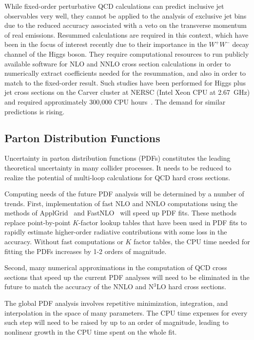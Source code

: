 \documentclass[12pt]{article}
\newcommand{\registered}{\textsuperscript{\textregistered}\xspace}
\begin{document}
While fixed-order perturbative QCD calculations can predict inclusive
jet observables very well, they cannot be applied to the analysis of 
exclusive jet bins due to the reduced accuracy associated with
a veto on the transverse momentum of real emissions.
Resummed calculations are required in this context, which have been
in the focus of interest recently due to their importance in the
$W^+W^-$ decay channel of the Higgs boson. They require computational
resources to run publicly available software for NLO and NNLO cross
section calculations in order to numerically extract coefficients needed
for the resummation, and also in order to match to the fixed-order result. 
Such studies have been performed for Higgs plus jet cross sections
on the Carver cluster at NERSC (Intel\registered Xeon\registered CPU at 2.67~GHz) 
and required approximately 300,000 CPU hours~\cite{Stewart:2013faa}. 
The demand for similar predictions is rising.

\subsection{Parton Distribution Functions}

Uncertainty in parton distribution functions (PDFs) constitutes the
leading theoretical uncertainty in many collider processes. It needs
to be reduced to realize the potential of multi-loop calculations for
QCD hard cross sections.

Computing needs of the future PDF analysis will be determined by a
number of trends.  First, implementation of fast NLO and NNLO
computations using the methods of ApplGrid~\cite{Carli:2010rw} 
and FastNLO~\cite{Kluge:2006xs} will speed up
PDF fits. These methods replace point-by-point $K$-factor lookup tables that
have been used in PDF fits to rapidly estimate higher-order radiative
contributions with some loss in the accuracy.  Without fast
computations or $K$ factor tables, the CPU time needed for fitting the PDFs
increases by 1-2 orders of magnitude.

Second, many numerical approximations in the computation of QCD cross
sections that speed up the current PDF analyses will need to be
eliminated in the future to match the accuracy of the NNLO and N$^3$LO
hard cross sections.

The global PDF analysis involves repetitive minimization, integration,
and interpolation in the space of many parameters.  The CPU time expenses
for every such step will need to be raised by up to an order of
magnitude, leading to nonlinear growth in the CPU time spent on the whole fit.
\end{document}

